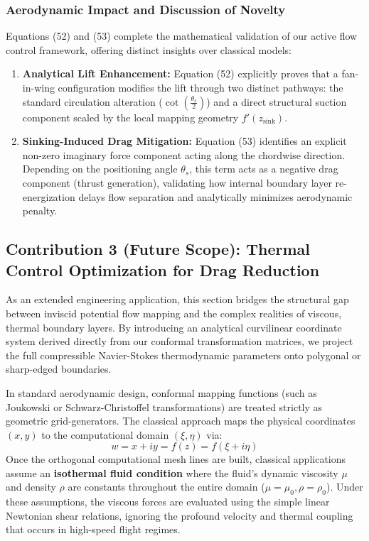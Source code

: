 \documentclass[12pt,a4paper]{article}
\begin{document}
\subsubsection{Aerodynamic Impact and Discussion of Novelty}
Equations (52) and (53) complete the mathematical validation of our active flow control framework, offering distinct insights over classical models:
\begin{enumerate}
    \item \textbf{Analytical Lift Enhancement:} Equation (52) explicitly proves that a fan-in-wing configuration modifies the lift through two distinct pathways: the standard circulation alteration ($\cot(\frac{\theta_s}{2})$) and a direct structural suction component scaled by the local mapping geometry $f'(z_{\text{sink}})$.
    \item \textbf{Sinking-Induced Drag Mitigation:} Equation (53) identifies an explicit non-zero imaginary force component acting along the chordwise direction. Depending on the positioning angle $\theta_s$, this term acts as a negative drag component (thrust generation), validating how internal boundary layer re-energization delays flow separation and analytically minimizes aerodynamic penalty.
\end{enumerate}
\subsection{Contribution 3 (Future Scope): Thermal Control Optimization for Drag Reduction}

As an extended engineering application, this section bridges the structural gap between inviscid potential flow mapping and the complex realities of viscous, thermal boundary layers. By introducing an analytical curvilinear coordinate system derived directly from our conformal transformation matrices, we project the full compressible Navier-Stokes thermodynamic parameters onto polygonal or sharp-edged boundaries.

\begin{tcolorbox}[colback=blue!5, colframe=blue!65!black, title=\textbf{State of the Art: Classical Conformal Grid Generation and Isothermal Limits}]
In standard aerodynamic design, conformal mapping functions (such as Joukowski or Schwarz-Christoffel transformations) are treated strictly as geometric grid-generators. The classical approach maps the physical coordinates $(x,y)$ to the computational domain $(\xi,\eta)$ via:
\begin{equation}
    w = x + iy = f(z) = f(\xi + i\eta)
\end{equation}
Once the orthogonal computational mesh lines are built, classical applications assume an \textbf{isothermal fluid condition} where the fluid's dynamic viscosity $\mu$ and density $\rho$ are constants throughout the entire domain ($\mu = \mu_0, \rho = \rho_0$). Under these assumptions, the viscous forces are evaluated using the simple linear Newtonian shear relations, ignoring the profound velocity and thermal coupling that occurs in high-speed flight regimes.
\end{tcolorbox}
\end{document}
